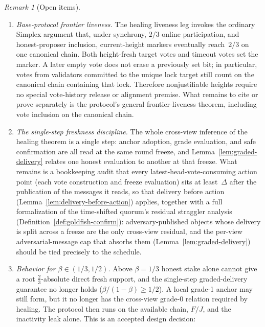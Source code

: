 \ifx\litemode\undefined\documentclass{article}\fi
\theoremstyle{plain}
\theoremstyle{definition}
\theoremstyle{remark}
\newtheorem{remark}[theorem]{Remark}
\begin{document}
\begin{remark}[Open items]\label{rem:open-items}
\leavevmode
\begin{enumerate}[label=(\arabic*)]
  \item \emph{Base-protocol frontier liveness.}
    The healing liveness leg invokes the ordinary Simplex argument that, under
    synchrony, \(2/3\) online participation, and honest-proposer inclusion,
    current-height markers eventually reach~\(2/3\) on one canonical chain.
    Both height-fresh target votes and timeout votes set the marker.  A later
    empty vote does not erase a previously set bit; in particular, votes from
    validators committed to the unique lock target still count on the canonical
    chain containing that lock.  Therefore nonjustifiable heights require no
    special vote-history release or alignment premise.  What remains to cite or
    prove separately is the protocol's general frontier-liveness theorem,
    including vote inclusion on the canonical chain.
  \item \emph{The single-step freshness discipline.}
    The whole cross-view inference of the healing theorem is a single step: anchor
    adoption, grade evaluation, and safe confirmation are all read at the same round
    freeze, and Lemma~\ref{lem:graded-delivery} relates one honest evaluation to
    another at that freeze.  What remains is a bookkeeping audit that every
    latest-head-vote-consuming action point (each vote construction and freeze
    evaluation) sits at least~\(\Delta\) after the publication of the messages it reads, so
    that delivery before action (Lemma~\ref{lem:delivery-before-action}) applies,
    together with a full formalization of the time-shifted quorum's residual
    straggler analysis (Definition~\ref{def:goldfish-confirm}): adversary-published
    objects whose delivery is split across a freeze are the only cross-view
    residual, and the per-view adversarial-message cap that absorbs them
    (Lemma~\ref{lem:graded-delivery}) should be tied precisely to the schedule.
  \item \emph{Behavior for \(\beta \in (1/3, 1/2)\).}
    Above \(\beta = 1/3\) honest stake alone cannot give a root
    \(\tfrac23\)-absolute direct fresh support, and the single-step graded-delivery
    guarantee no longer holds (\(\beta/(1-\beta) \geq 1/2\)).  A local grade-1
    anchor may still form, but it no longer has the cross-view grade-0 relation
    required by healing.  The protocol then runs on the available chain,
    \(F/J\), and the inactivity leak alone.  This is an accepted design decision:

\end{enumerate}
\end{remark}
\end{document}
